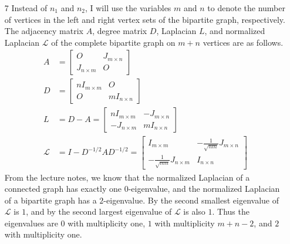 \documentclass{article}
\newcommand{\1}{\mathbf{1}}
\newcommand{\0}{\mathbf{0}}
\renewcommand{\L}{\mathcal{L}}
\begin{document}
\begin{enumerate}
\item[7]
  Instead of $n_1$ and $n_2$, I will use the variables $m$ and $n$ to denote the number of vertices in the left and right vertex sets of the bipartite graph, respectively.
  The adjacency matrix $A$, degree matrix $D$, Laplacian $L$, and normalized Laplacian $\L$ of the complete bipartite graph on $m + n$ vertices are as follows.
  \begin{align*}
    A & =
    \begin{bmatrix}
      O & J_{m \times n} \\
      J_{n \times m} & O
    \end{bmatrix}
    \\
    D & =
    \begin{bmatrix}
      n I_{m \times m} & O \\
      O & m I_{n \times n}
    \end{bmatrix}
    \\
    L & = D - A =
    \begin{bmatrix}
      n I_{m \times m} & -J_{m \times n} \\
      -J_{n \times m} & m I_{n \times n}
    \end{bmatrix}
    \\
    \L & = I - D^{-1 / 2} A D^{-1 / 2} =
    \begin{bmatrix}
      I_{m \times m} & -\frac{1}{\sqrt{n m}} J_{m \times n} \\
      -\frac{1}{\sqrt{m n}} J_{n \times m} & I_{n \times n}
    \end{bmatrix}
  \end{align*}
  From the lecture notes, we know that the normalized Laplacian of a connected graph has exactly one $0$-eigenvalue, and the normalized Laplacian of a bipartite graph has a $2$-eigenvalue.
  By \autocite[Theorem~3.11]{lgs14} the second smallest eigenvalue of $\L$ is $1$, and by \autocite[Theorem~3.12]{lgs14} the second largest eigenvalue of $\L$ is also $1$.
  Thus the eigenvalues are $0$ with multiplicity one, $1$ with multiplicity $m + n - 2$, and $2$ with multiplicity one.


\end{enumerate}
\end{document}
